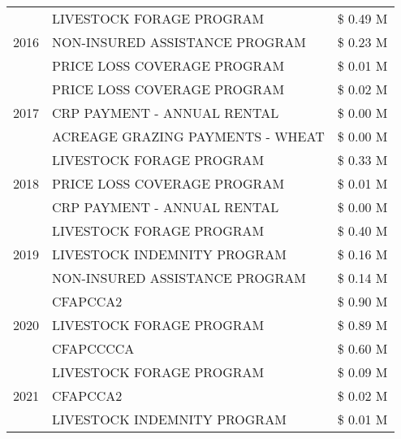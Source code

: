 \begin{tabular}{llr}
\multirow[t]{3}{*}{2016} & LIVESTOCK FORAGE PROGRAM & \$ 0.49 M \\
 & NON-INSURED ASSISTANCE PROGRAM & \$ 0.23 M \\
 & PRICE LOSS COVERAGE PROGRAM & \$ 0.01 M \\
\cline{1-3}
\multirow[t]{3}{*}{2017} & PRICE LOSS COVERAGE PROGRAM & \$ 0.02 M \\
 & CRP PAYMENT - ANNUAL RENTAL & \$ 0.00 M \\
 & ACREAGE GRAZING PAYMENTS - WHEAT & \$ 0.00 M \\
\cline{1-3}
\multirow[t]{3}{*}{2018} & LIVESTOCK FORAGE PROGRAM & \$ 0.33 M \\
 & PRICE LOSS COVERAGE PROGRAM & \$ 0.01 M \\
 & CRP PAYMENT - ANNUAL RENTAL & \$ 0.00 M \\
\cline{1-3}
\multirow[t]{3}{*}{2019} & LIVESTOCK FORAGE PROGRAM & \$ 0.40 M \\
 & LIVESTOCK INDEMNITY PROGRAM & \$ 0.16 M \\
 & NON-INSURED ASSISTANCE PROGRAM & \$ 0.14 M \\
\cline{1-3}
\multirow[t]{3}{*}{2020} & CFAPCCA2 & \$ 0.90 M \\
 & LIVESTOCK FORAGE PROGRAM & \$ 0.89 M \\
 & CFAPCCCCA & \$ 0.60 M \\
\cline{1-3}
\multirow[t]{3}{*}{2021} & LIVESTOCK FORAGE PROGRAM & \$ 0.09 M \\
 & CFAPCCA2 & \$ 0.02 M \\
 & LIVESTOCK INDEMNITY PROGRAM & \$ 0.01 M \\
\cline{1-3}
\bottomrule
\end{tabular}
